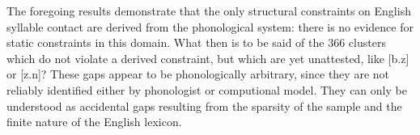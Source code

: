 The foregoing results demonstrate that the only structural constraints on English syllable contact are derived from the phonological system: there is no evidence for static constraints in this domain.
What then is to be said of the 366 clusters which do not violate a derived constraint, but which are yet unattested, like [b.z] or [z.n]? 
These gaps appear to be phonologically arbitrary, since they are not reliably identified either by phonologist or computional model.
They can only be understood as accidental gaps resulting from the sparsity of the sample and the finite nature of the English lexicon.

% 

